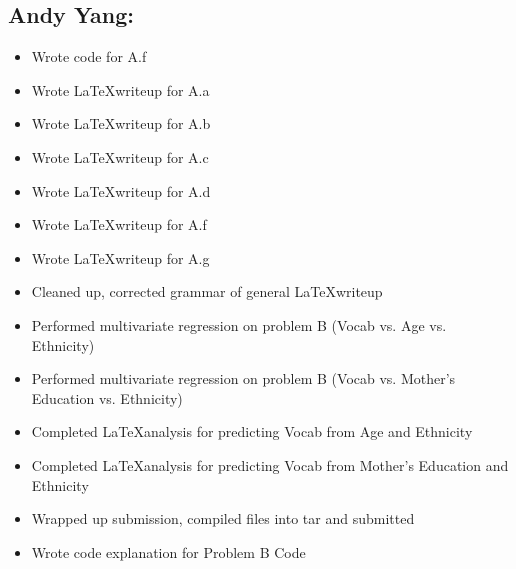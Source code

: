 \documentclass{article}
\begin{document}
  \subsection*{Andy Yang:}
  \begin{itemize}
    \item Wrote code for A.f
    \item Wrote \LaTeX  writeup for A.a
    \item Wrote \LaTeX  writeup for A.b
    \item Wrote \LaTeX  writeup for A.c
    \item Wrote \LaTeX  writeup for A.d
    \item Wrote \LaTeX  writeup for A.f
    \item Wrote \LaTeX  writeup for A.g
    \item Cleaned up, corrected grammar of general \LaTeX  writeup
    \item Performed multivariate regression on problem B (Vocab vs. Age vs. Ethnicity)
    \item Performed multivariate regression on problem B (Vocab vs. Mother's Education vs. Ethnicity)
    \item Completed \LaTeX  analysis for predicting Vocab from Age and Ethnicity
    \item Completed \LaTeX  analysis for predicting Vocab from Mother's Education and Ethnicity
    \item Wrapped up submission, compiled files into tar and submitted
    \item Wrote code explanation for Problem B Code
  \end{itemize}
\end{document}
